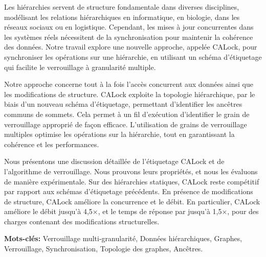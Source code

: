 %
\label{chap:résumé}

\vspace*{8mm}
Les hiérarchies servent de structure fondamentale dans diverses disciplines, modélisant les relations hiérarchiques en informatique, en biologie, dans les réseaux sociaux ou en logistique. Cependant, les mises à jour concurrentes dans les systèmes réels nécessitent de la synchronisation pour maintenir la cohérence des données. Notre travail explore une nouvelle approche, appelée CALock, pour  synchroniser les opérations sur une hiérarchie, en utilisant un schéma d’étiquetage qui facilite le verrouillage à granularité multiple.

Notre approche concerne tout à la fois l'accès concurrent aux données ainsi que les modifications de structure. CALock exploite la topologie hiérarchique, par le biais d’un nouveau schéma d’étiquetage, permettant d’identifier les ancêtres communs de sommets. Cela permet à un fil d'exécution d’identifier le grain de verrouillage approprié de façon efficace. L’utilisation de grains de verrouillage multiples optimise les opérations sur la hiérarchie, tout en garantissant la cohérence et les performances.

Nous présentons une discussion détaillée de l’étiquetage CALock et de l’algorithme de verrouillage. Nous prouvons leurs propriétés, et nous les évaluons de manière expérimentale. Sur des hiérarchies statiques, CALock reste compétitif par rapport aux schémas d’étiquetage précédents.  En présence de modifications de structure, CALock améliore la concurrence et le débit. En particulier, CALock améliore le débit jusqu’à 4,5×, et le temps de réponse par jusqu'à 1,5×, pour des charges contenant des modifications structurelles.

\textbf{Mots-clés:} 
Verrouillage multi-granularité, Données hiérarchiques, Graphes, Verrouillage, Synchronisation, Topologie des graphes, Ancêtres. 